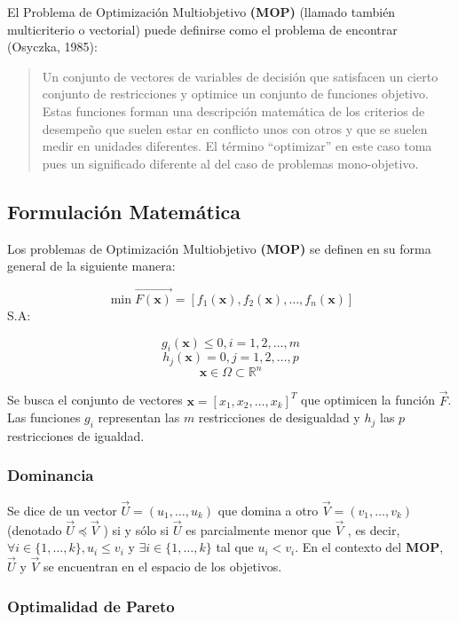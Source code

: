 \documentclass[letterpaper,10pt]{article}
\begin{document}
El Problema de Optimización Multiobjetivo \textbf{(MOP)} (llamado también
multicriterio o vectorial) puede definirse como el problema de
encontrar (Osyczka, 1985)\cite{Osyczka1985193}:
\begin{quote}
Un conjunto de vectores de variables de decisión que satisfacen un cierto
conjunto de restricciones y optimice un conjunto de funciones
objetivo. Estas funciones forman una descripción matemática
de los criterios de desempeño que suelen estar en conflicto
unos con otros y que se suelen medir en unidades diferentes.
El término ``optimizar'' en este caso toma pues un significado
diferente al del caso de problemas mono-objetivo.
\end{quote}



\subsection{Formulación Matemática}
Los problemas de Optimización Multiobjetivo \textbf{(MOP)} se definen en su forma general de la siguiente manera:
 
$$\min \overrightarrow{F(\bm{x})} = \left[ f_1(\bm{x}), f_2(\bm{x}) , \dots, f_n(\bm{x}) \right] $$
S.A:
 
$$g_i(\bm{x}) \leq 0, i=1,2,\dots,m$$
$$h_j(\bm{x}) = 0, j=1,2,\dots,p$$
$$\bm{x} \in \Omega \subset \mathbb{R}^n$$

Se busca el conjunto de vectores $\bm{x}=[x_1,x_2,\dots,x_k]^T$ que optimicen la función $\overrightarrow{F}$. Las funciones $g_i$ representan las $m$ restricciones de desigualdad y $h_j$ las $p$ restricciones de igualdad.

\subsubsection{Dominancia}

Se dice de un vector $\overrightarrow{U}= (u_1 ,\dots, u_k )$ que domina a otro $\overrightarrow{V}= (v_1 ,\dots, v_k )$ (denotado $\overrightarrow{U} \preceq \overrightarrow{V}$ ) si y sólo si $\overrightarrow{U}$ es parcialmente menor que $\overrightarrow{V}$ , es decir,
$\forall i \in \{1,\dots, k\}, u_i \leq v_i$ y $\exists i \in \{1,\dots, k \} $ tal que  $u_i<v_i$.
\newline
En el contexto del \textbf{MOP},  $\overrightarrow{U}$ y $\overrightarrow{V}$ se encuentran en el espacio de los objetivos.
 
\subsubsection{Optimalidad de Pareto}
\end{document}
